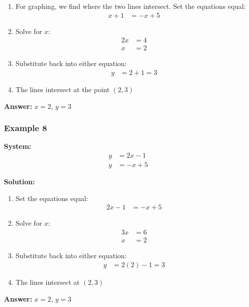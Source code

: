 \documentclass{article}
\begin{document}
\begin{enumerate}
    \item For graphing, we find where the two lines intersect. Set the equations equal:
    \begin{align*}
        x + 1 &= -x + 5
    \end{align*}
    \item Solve for $x$:
    \begin{align*}
        2x &= 4 \\
        x &= 2
    \end{align*}
    \item Substitute back into either equation:
    \begin{align*}
        y &= 2 + 1 = 3
    \end{align*}
    \item The lines intersect at the point $(2, 3)$
\end{enumerate}

\textbf{Answer:} $x = 2, \, y = 3$ \,  

\subsubsection{Example 8}

\textbf{System:}
\begin{align*}
y &= 2x - 1 \\
y &= -x + 5
\end{align*}

\textbf{Solution:}

\begin{enumerate}
    \item Set the equations equal:
    \begin{align*}
        2x - 1 &= -x + 5
    \end{align*}
    \item Solve for $x$:
    \begin{align*}
        3x &= 6 \\
        x &= 2
    \end{align*}
    \item Substitute back into either equation:
    \begin{align*}
        y &= 2(2) - 1 = 3
    \end{align*}
    \item The lines intersect at $(2, 3)$
\end{enumerate}

\textbf{Answer:} $x = 2, \, y = 3$ \,  
\end{document}
